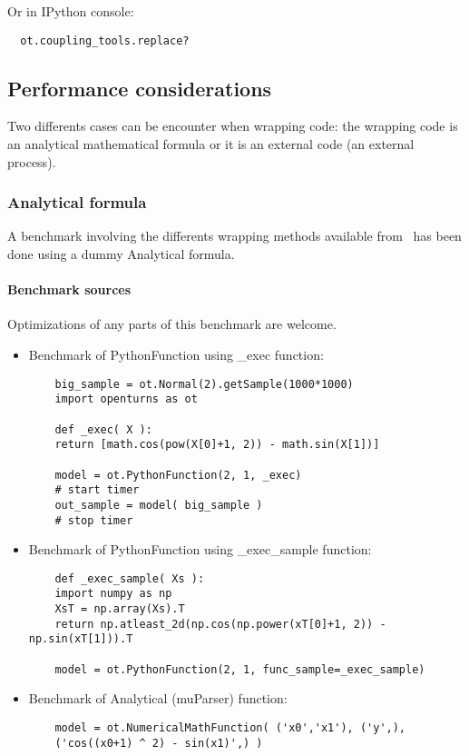 Or in IPython console:
\begin{lstlisting}
  ot.coupling_tools.replace?
\end{lstlisting}


\subsection{Performance considerations\label{speedo}}

Two differents cases can be encounter when wrapping code: the wrapping code is an analytical mathematical formula or it is an external code (an external process).

\subsubsection{Analytical formula}

A benchmark involving the differents wrapping methods available from \OT\ has been done using a dummy Analytical formula.


\paragraph{Benchmark sources} Optimizations of any parts of this benchmark are welcome.

\begin{itemize}
\item Benchmark of PythonFunction using \_exec function:
  \begin{lstlisting}
    big_sample = ot.Normal(2).getSample(1000*1000)
    import openturns as ot

    def _exec( X ):
    return [math.cos(pow(X[0]+1, 2)) - math.sin(X[1])]

    model = ot.PythonFunction(2, 1, _exec)
    # start timer
    out_sample = model( big_sample )
    # stop timer
  \end{lstlisting}

\item Benchmark of PythonFunction using \_exec\_sample function:
  \begin{lstlisting}
    def _exec_sample( Xs ):
    import numpy as np
    XsT = np.array(Xs).T
    return np.atleast_2d(np.cos(np.power(xT[0]+1, 2)) - np.sin(xT[1])).T

    model = ot.PythonFunction(2, 1, func_sample=_exec_sample)
  \end{lstlisting}

\item Benchmark of Analytical (muParser) function:
  \begin{lstlisting}
    model = ot.NumericalMathFunction( ('x0','x1'), ('y',),
    ('cos((x0+1) ^ 2) - sin(x1)',) )
  \end{lstlisting}

\end{itemize}


